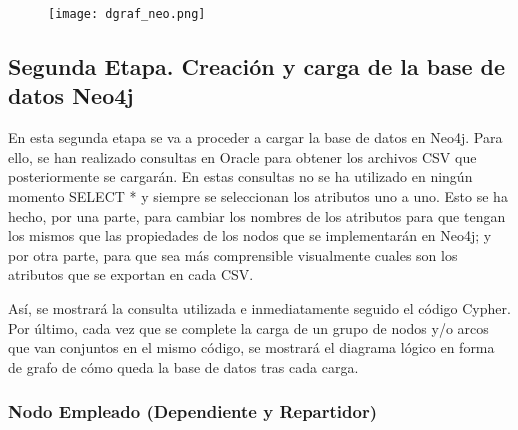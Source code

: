 \documentclass[a4paper]{article}
\begin{document}
\begin{figure}[H]
    \centering
    \texttt{[image: dgraf\_neo.png]}
    \label{fig:dgraf_neo}
\end{figure}

\newpage

\subsection{\huge{Segunda Etapa. Creación y carga de la base de datos Neo4j}}

En esta segunda etapa se va a proceder a cargar la base de datos en Neo4j. Para ello, se han realizado consultas en Oracle para obtener los archivos CSV que posteriormente se cargarán. En estas consultas no se ha utilizado en ningún momento SELECT * y siempre se seleccionan los atributos uno a uno. Esto se ha hecho, por una parte, para cambiar los nombres de los atributos para que tengan los mismos que las propiedades de los nodos que se implementarán en Neo4j; y por otra parte, para que sea más comprensible visualmente cuales son los atributos que se exportan en cada CSV.

\vspace{1.5mm}Así, se mostrará la consulta utilizada e inmediatamente seguido el código Cypher. Por último, cada vez que se complete la carga de un grupo de nodos y/o arcos que van conjuntos en el mismo código, se mostrará el diagrama lógico en forma de grafo de cómo queda la base de datos tras cada carga.

\subsubsection{\Large{Nodo Empleado (Dependiente y Repartidor)}}
\end{document}

